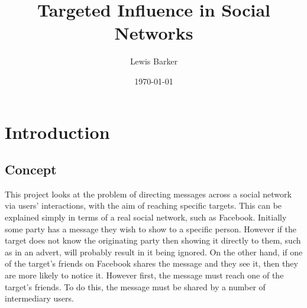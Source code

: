 \documentclass[bsc,frontabs,twoside,singlespacing,parskip,deptreport]{infthesis}     %
\begin{document}
\title{Targeted Influence in Social Networks}

\author{Lewis Barker}



\date{\today}

\abstract{

}

\maketitle

\tableofcontents



\chapter{Introduction}
\section{Concept}
This project looks at the problem of directing messages across a social network via users' interactions, with the aim of reaching specific targets. This can be explained simply in terms of a real social network, such as Facebook. Initially some party has a message they wish to show to a specific person. However if the target does not know the originating party  then showing it directly to them, such as in an advert, will probably result in it being ignored. On the other hand, if one of the target's friends on Facebook shares the message and they see it, then they are more likely to notice it. However first, the message must reach one of the target's friends. To do this, the message must be shared by a number of intermediary users.
\end{document}
